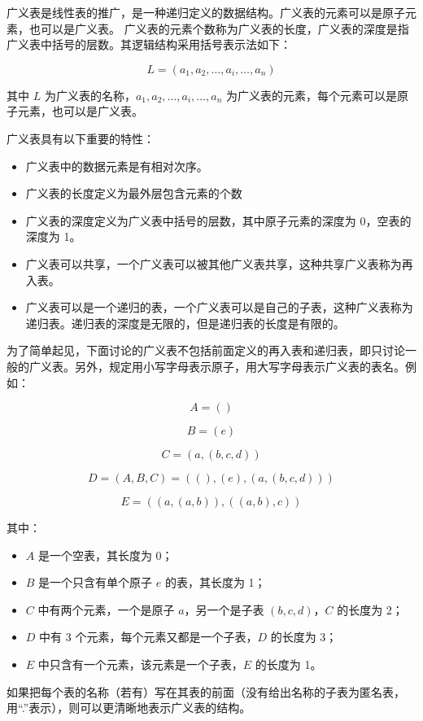 \documentclass[lang=cn,newtx,10pt,scheme=chinese]{elegantbook}
\begin{document}
广义表是线性表的推广，是一种递归定义的数据结构。广义表的元素可以是原子元素，也可以是广义表。
广义表的元素个数称为广义表的长度，广义表的深度是指广义表中括号的层数。其逻辑结构采用括号表示法如下：

\[
L = (a_1, a_2, \dots, a_i, \dots, a_n)
\]

其中 $L$ 为广义表的名称，$a_1, a_2, \dots, a_i, \dots, a_n$ 为广义表的元素，每个元素可以是原子元素，也可以是广义表。

广义表具有以下重要的特性：

\begin{itemize}
  \item 广义表中的数据元素是有相对次序。
  \item 广义表的长度定义为最外层包含元素的个数
  \item 广义表的深度定义为广义表中括号的层数，其中原子元素的深度为 0，空表的深度为 1。
  \item 广义表可以共享，一个广义表可以被其他广义表共享，这种共享广义表称为再入表。
  \item 广义表可以是一个递归的表，一个广义表可以是自己的子表，这种广义表称为递归表。递归表的深度是无限的，但是递归表的长度是有限的。
\end{itemize}

为了简单起见，下面讨论的广义表不包括前面定义的再入表和递归表，即只讨论一般的广义表。另外，规定用小写字母表示原子，用大写字母表示广义表的表名。例如：

\[
A = ()
\]

\[
 B = (e)
\]

\[
C = (a, (b, c, d))
\]

\[
D = (A, B, C) = ((), (e), (a, (b, c, d)))
\]

\[
E = ((a, (a, b)), ((a, b), c))
\]

其中：
\begin{itemize}
  \item $A$ 是一个空表，其长度为 0；
  \item $B$ 是一个只含有单个原子 $e$ 的表，其长度为 1；
  \item $C$ 中有两个元素，一个是原子 $a$，另一个是子表 $(b, c, d)$，$C$ 的长度为 2；
  \item $D$ 中有 3 个元素，每个元素又都是一个子表，$D$ 的长度为 3；
  \item $E$ 中只含有一个元素，该元素是一个子表，$E$ 的长度为 1。
\end{itemize}

如果把每个表的名称（若有）写在其表的前面（没有给出名称的子表为匿名表，用“.”表示），则可以更清晰地表示广义表的结构。
\end{document}
